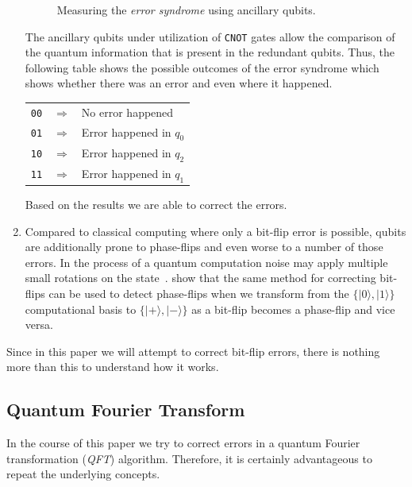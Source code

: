 \begin{enumerate}
\begin{figure}[H]
        \caption{Measuring the \emph{error syndrome} using ancillary qubits.}
        \label{fig:reading-ancilla-qubits-circuit}
    \end{figure}
    The ancillary qubits under utilization of \texttt{CNOT} gates allow the comparison of the quantum information that is present in the redundant qubits.
    Thus, the following table shows the possible outcomes of the error syndrome which shows whether there was an error and even where it happened.
    \begin{center}
        \begin{tabular}{ r c l }
            \texttt{00} & \(\Rightarrow\) & No error happened \\
            \texttt{01} & \(\Rightarrow\) & Error happened in \(q_0\) \\
            \texttt{10} & \(\Rightarrow\) & Error happened in \(q_2\) \\
            \texttt{11} & \(\Rightarrow\) & Error happened in \(q_1\)
        \end{tabular}
    \end{center}
    Based on the results we are able to correct the errors.
    \item Compared to classical computing where only a bit-flip error is possible, qubits are additionally prone to phase-flips and even worse to a number of those errors.
    In the process of a quantum computation noise may apply multiple small rotations on the state~\cite[p. 460]{benenti2004principles}.
     show that the same method for correcting bit-flips can be used to detect phase-flips when we transform from the \(\{|0\rangle, |1\rangle\}\) computational basis to \(\{|+\rangle, |-\rangle\}\) as a bit-flip becomes a phase-flip and vice versa.
\end{enumerate}

Since in this paper we will attempt to correct bit-flip errors, there is nothing more than this to understand how it works.

\subsection{Quantum Fourier Transform}
\label{subsec:quantum-fourier-transform}

In the course of this paper we try to correct errors in a quantum Fourier transformation (\emph{QFT}) algorithm.
Therefore, it is certainly advantageous to repeat the underlying concepts.

